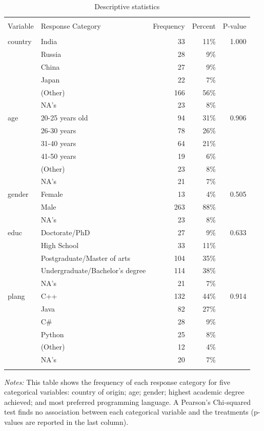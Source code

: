 \documentclass[12pt,]{article}
\theoremstyle{plain} %
\newenvironment{tablenotes}[1][]{
  \begin{minipage}{\textwidth}\emph{Notes:}{\footnotesize #1}
}{\end{minipage}}
\begin{document}
\begin{table}
\centering
\caption{Descriptive statistics}
\label{descriptives}
\begin{tabular}{lp{5cm}rrr}
  \\[-1.8ex]\hline\hline\\[-1.8ex]
Variable & Response Category & Frequency & Percent & P-value \\ 
  \hline\\[-1.86ex]
country & India & 33 & 11\% & 1.000 \\ 
   & Russia & 28 & 9\% &  \\ 
   & China & 27 & 9\% &  \\ 
   & Japan & 22 & 7\% &  \\ 
   & (Other) & 166 & 56\% &  \\ 
   & NA's & 23 & 8\% &  \\ 
  age & 20-25 years old & 94 & 31\% & 0.906 \\ 
   & 26-30 years & 78 & 26\% &  \\ 
   & 31-40 years & 64 & 21\% &  \\ 
   & 41-50 years & 19 & 6\% &  \\ 
   & (Other) & 23 & 8\% &  \\ 
   & NA's & 21 & 7\% &  \\ 
  gender & Female & 13 & 4\% & 0.505 \\ 
   & Male & 263 & 88\% &  \\ 
   & NA's & 23 & 8\% &  \\ 
  educ & Doctorate/PhD & 27 & 9\% & 0.633 \\ 
   & High School & 33 & 11\% &  \\ 
   & Postgraduate/Master of arts & 104 & 35\% &  \\ 
   & Undergraduate/Bachelor's degree & 114 & 38\% &  \\ 
   & NA's & 21 & 7\% &  \\ 
  plang & C++ & 132 & 44\% & 0.914 \\ 
   & Java & 82 & 27\% &  \\ 
   & C\# & 28 & 9\% &  \\ 
   & Python & 25 & 8\% &  \\ 
   & (Other) & 12 & 4\% &  \\ 
   & NA's & 20 & 7\% &  \\ 
   \hline\\[-1.8ex]
\end{tabular}
\begin{tablenotes}\footnotesize
This table shows the frequency of each response category for five categorical variables: country of origin; age; gender; highest academic degree achieved; and most preferred programming language. A Pearson's Chi-squared test finds no association between each categorical variable and the treatments (p-values are reported in the last column).
\end{tablenotes}
\end{table}
\end{document}
